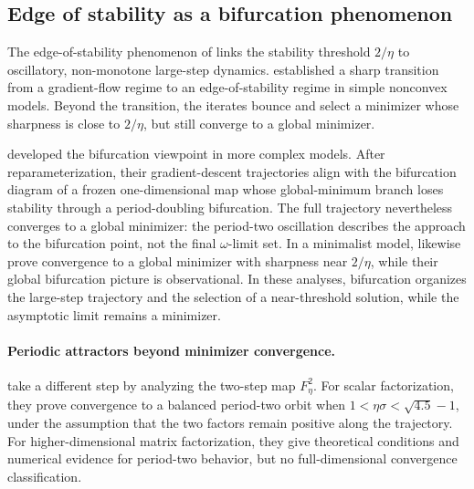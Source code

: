 \documentclass{article}
\begin{document}
\subsection{Edge of stability as a bifurcation phenomenon}
\label{subsec:rw_eos}

The edge-of-stability phenomenon of \citet{cohen2021gradient} links the
stability threshold $2/\eta$ to oscillatory, non-monotone large-step dynamics.
\citet{ahn2023learning} established a sharp transition from a gradient-flow
regime to an edge-of-stability regime in simple nonconvex models. Beyond the
transition, the iterates bounce and select a minimizer whose sharpness is close
to $2/\eta$, but still converge to a global minimizer.

\citet{song2023trajectory} developed the bifurcation viewpoint in more complex
models. After reparameterization, their gradient-descent trajectories align
with the bifurcation diagram of a frozen one-dimensional map whose
global-minimum branch loses stability through a period-doubling bifurcation.
The full trajectory nevertheless converges to a global minimizer: the
period-two oscillation describes the approach to the bifurcation point, not the
final $\omega$-limit set. In a minimalist model,
\citet{zhu2022understanding} likewise prove convergence to a global minimizer
with sharpness near $2/\eta$, while their global bifurcation picture is
observational. In these analyses, bifurcation organizes the large-step
trajectory and the selection of a near-threshold solution, while the
asymptotic limit remains a minimizer.

\paragraph{Periodic attractors beyond minimizer convergence.}
\citet{chen2023beyond} take a different step by analyzing the two-step map
$F_\eta^2$. For scalar factorization, they prove convergence to a balanced
period-two orbit when $1<\eta\sigma<\sqrt{4.5}-1$, under the assumption that the
two factors remain positive along the trajectory. For higher-dimensional
matrix factorization, they give theoretical conditions and numerical evidence
for period-two behavior, but no full-dimensional convergence classification.
\end{document}
